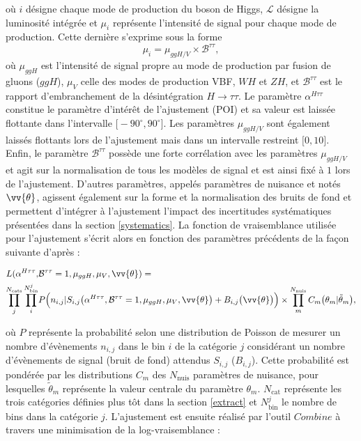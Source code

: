 où $i$ désigne chaque mode de production du boson de Higgs, $\mathcal{L}$ désigne la luminosité intégrée et $\mu_i$ représente l'intensité de signal pour chaque mode de production. Cette dernière s'exprime sous la forme $$\mu_i=\mu_{ggH/V}\times\mathcal{B}^{\tau\tau},$$ où $\mu_{ggH}$ est l'intensité de signal propre au mode de production par fusion de gluons ($ggH$),  $\mu_{V}$ celle des modes de production VBF, $WH$ et $ZH$, et $\mathcal{B}^{\tau\tau}$ est le rapport d'embranchement de la désintégration $H\to\tau\tau$. Le paramètre $\alpha^{H\tau\tau}$ constitue le paramètre d'intérêt de l'ajustement (POI) et sa valeur est laissée flottante dans l'intervalle $\bigl[-90^\circ,90^\circ\bigr]$. Les paramètres $\mu_{ggH/V}$ sont également laissés flottants lors de l'ajustement mais dans un intervalle restreint $\bigl[0,10\bigr]$. Enfin, le paramètre $\mathcal{B}^{\tau\tau}$ possède une forte corrélation avec les paramètres $\mu_{ggH/V}$ et agit sur la normalisation de tous les modèles de signal et est ainsi fixé à $1$ lors de l'ajustement. D'autres paramètres, appelés paramètres de nuisance et notés $\vv{\theta}$, agissent également sur la forme et la normalisation des bruits de fond et permettent d'intégrer à l'ajustement l'impact des incertitudes systématiques présentées dans la section \ref{systematics}. La fonction de vraisemblance utilisée pour l'ajustement s'écrit alors en fonction des paramètres précédents de la façon suivante d'après \cite{likelihood} :

\begin{align}
    L(\alpha^{H\tau\tau},&\mathcal{B}^{\tau\tau}=1,\mu_{ggH},\mu_{V},\vv{\theta}) = \\
    \prod_{j}^{N_{\text{cats}}}\prod_{i}^{N^j_{\text{bin}}} & P\Bigl(n_{i,j}|S_{i,j}\bigl(\alpha^{H\tau\tau},\mathcal{B}^{\tau\tau}=1,\mu_{ggH},\mu_{V},\vv{\theta}\bigr)+B_{i,j}\bigl(\vv{\theta}\bigr)\Bigr)\times\prod_{m}^{N_{\text{nuis}}}C_m\bigl(\theta_m|\tilde{\theta}_m\bigr), \nonumber
\end{align}

où $P$ représente la probabilité selon une distribution de Poisson de mesurer un nombre d'évènements $n_{i,j}$ dans le bin $i$ de la catégorie $j$ considérant un nombre d'évènements de signal (bruit de fond) attendus $S_{i,j}$ ($B_{i,j}$). Cette probabilité est pondérée par les distributions $C_m$ des $N_\text{nuis}$ paramètres de nuisance, pour lesquelles $\tilde{\theta}_m$ représente la valeur centrale du paramètre $\theta_m$. $N_\text{cat}$ représente les trois catégories définies plus tôt dans la section \ref{extract} et $N^j_\text{bin}$ le nombre de bins dans la catégorie $j$. L'ajustement est ensuite réalisé par l'outil $Combine$ à travers une minimisation de la log-vraisemblance :


